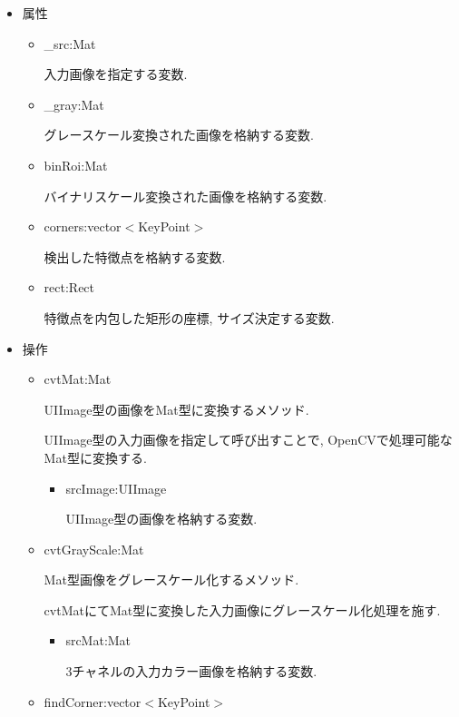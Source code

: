 \begin{itemize}
\item 属性

\begin{itemize}
\item \_src:Mat

入力画像を指定する変数.

\item \_gray:Mat

グレースケール変換された画像を格納する変数.

\item binRoi:Mat

バイナリスケール変換された画像を格納する変数.

\item corners:vector$<$KeyPoint$>$

検出した特徴点を格納する変数.

\item rect:Rect

特徴点を内包した矩形の座標, サイズ決定する変数.

\end{itemize}

\item 操作

\begin{itemize}
\item cvtMat:Mat

UIImage型の画像をMat型に変換するメソッド.

UIImage型の入力画像を指定して呼び出すことで, OpenCVで処理可能なMat型に変換する.

\begin{itemize}
\item srcImage:UIImage

UIImage型の画像を格納する変数.
\end{itemize}

\item cvtGrayScale:Mat

Mat型画像をグレースケール化するメソッド.

cvtMatにてMat型に変換した入力画像にグレースケール化処理を施す.

\begin{itemize}
\item srcMat:Mat

3チャネルの入力カラー画像を格納する変数.
\end{itemize}

\item findCorner:vector$<$KeyPoint$>$


\end{itemize}
\end{itemize}
